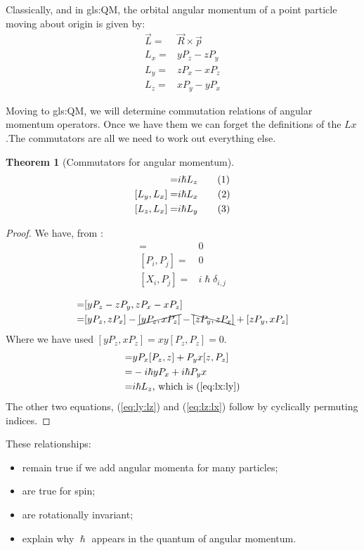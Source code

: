 \documentclass[]{article}
\newcommand\numberthis{\addtocounter{equation}{1}\tag{\theequation}}
\newtheorem{thm}{Theorem}
\begin{document}
Classically, and in \glsdesc{gls:QM}, the orbital angular momentum of a point particle moving about origin is given by:
\begin{align*}
	\vec{L} =& \vec{R} \times \vec{p} \\
	L_x =& y P_z - z P_y\\
	L_y =& z P_x - x P_z\\
	L_z =& x P_y - y P_x
\end{align*}

Moving to \glsdesc{gls:QM}, we will determine commutation relations of angular momentum operators. Once we have them we can forget the definitions of the $Lx$.The commutators are all we need to work out everything else.

\begin{thm}[Commutators for angular momentum]
	\begin{align*}
	[L_x,L_y]=& i \hslash L_z \numberthis \label{eq:lx:ly}\\
	[L_y,L_x]=& i \hslash L_x \numberthis \label{eq:ly:lz}\\
	[L_z,L_x]=& i \hslash L_y \numberthis \label{eq:lz:lx}	
	\end{align*}
\end{thm}
\begin{proof}
	We have, from \cite{susskind2014quantum}:
	\begin{align*}
		[X_i,X_j] =& 0\\
		[P_i,P_j]=& 0\\
		[X_i,P_j]=& i \hslash \delta_{i,j}
	\end{align*}

	\begin{align*}
			[L_x,L_y]=& [y P_z - z P_y,z P_x - x P_z]\\
	=&[y P_z, z P_x] -\cancel{[yP_z,xP_z]} -\bcancel{[zP_y,zP_x]} + [z P_y,x P_z]
	\end{align*}
	Where we have used $[yP_z,xP_z]=xy[P_z,P_z]=0$.
	\begin{align*}
		[L_x,L_y]=& y P_x[P_z,z] + P_y x[z,P_z]\\
		=& -i \hslash y P_x + i \hslash P_y x\\
		=& i \hslash L_z \text{, which is (\ref{eq:lx:ly})} 
	\end{align*}
	The other two equations, (\ref{eq:ly:lz}) and (\ref{eq:lz:lx}) follow by cyclically permuting indices.
\end{proof}

 These relationships:
\begin{itemize}
	\item remain true if we add angular momenta for many particles;
	\item are true for spin;
	\item are rotationally invariant;
	\item explain why $\hslash$ appears in the quantum of angular momentum.
\end{itemize}
\end{document}
